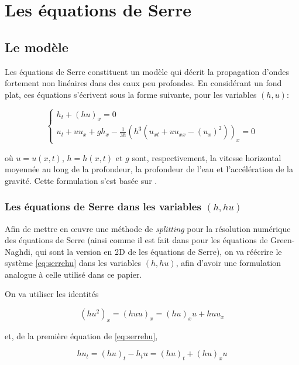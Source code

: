 \section{Les équations de Serre}
\label{sec:Serre}

\subsection{Le modèle}

\indent Les équations de Serre constituent un modèle qui décrit la propagation d'ondes fortement non linéaires dans des eaux peu profondes. En considérant un fond plat, ces équations s'écrivent sous la forme suivante, pour les variables $(h,u)$:

\begin{equation}
\label{eq:serrehu}
\begin{cases}
h_t + (hu)_x = 0 \\
u_t + uu_x + gh_x - \frac{1}{3h}\left(h^3 \left( u_{xt} + uu_{xx} - (u_x)^2  \right) \right)_x = 0
\end{cases}
\end{equation}

\noindent où $u = u(x,t)$, $h = h(x,t)$ et $g$ sont, respectivement, la vitesse horizontal moyennée au long de la profondeur, la profondeur de l'eau et l'accélération de la gravité. Cette formulation s'est basée sur \cite{CarterCienfuegos2011}.

\subsubsection{Les équations de Serre dans les variables $(h,hu)$}

\indent Afin de mettre en œuvre une méthode de \emph{splitting} pour la résolution numérique des équations de Serre (ainsi comme il est fait dans \cite{Bonneton2011} pour les équations de Green-Naghdi, qui sont la version en 2D de les équations de Serre), on va réécrire le système \eqref{eq:serrehu} dans les variables $(h,hu)$, afin d'avoir une formulation analogue à celle utilisé dans ce papier.

\indent On va utiliser les identités

\begin{equation*}
	(hu^2)_x = (huu)_x = (hu)_xu + huu_x
\end{equation*}

\noindent et, de la première équation de \eqref{eq:serrehu},

\begin{equation*}
	hu_t = (hu)_t - h_tu = (hu)_t +  (hu)_xu
\end{equation*}

